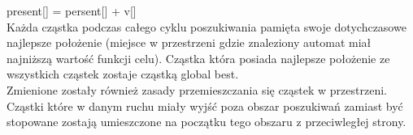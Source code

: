\documentclass[runningheads,a4paper]{llncs}
\begin{document}
present[] = persent[] + v[] \\

Każda cząstka podczas całego cyklu poszukiwania pamięta swoje dotychczasowe najlepsze położenie (miejsce w przestrzeni gdzie znaleziony automat miał najniższą wartość funkcji celu). Cząstka która posiada najlepsze położenie ze wszystkich cząstek zostaje cząstką global best. \\

Zmienione zostały również zasady przemieszczania się cząstek w przestrzeni. Cząstki które w danym ruchu miały wyjść poza obszar poszukiwań zamiast być stopowane zostają umieszczone na początku tego obszaru z przeciwległej strony. \\
\end{document}
